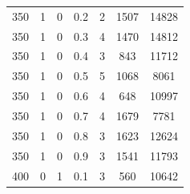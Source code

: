 \documentclass[12pt]{report}
\begin{document}
\begin{table}[H]
\begin{center}
\begin{tabular}{|c|c|c|c|c|c|c|}
				350 & 1 & 0 & 0.2 & 2 & 1507 & 14828 \\
				350 & 1 & 0 & 0.3 & 4 & 1470 & 14812 \\
				350 & 1 & 0 & 0.4 & 3 & 843 & 11712 \\
				350 & 1 & 0 & 0.5 & 5 & 1068 & 8061 \\
				350 & 1 & 0 & 0.6 & 4 & 648 & 10997 \\
				350 & 1 & 0 & 0.7 & 4 & 1679 & 7781 \\
				350 & 1 & 0 & 0.8 & 3 & 1623 & 12624 \\
				350 & 1 & 0 & 0.9 & 3 & 1541 & 11793 \\
				400 & 0 & 1 & 0.1 & 3 & 560 & 10642 \\
				\hline 	
			\end{tabular}
		\end{center}
	\end{table}
	\newpage
\end{document}
